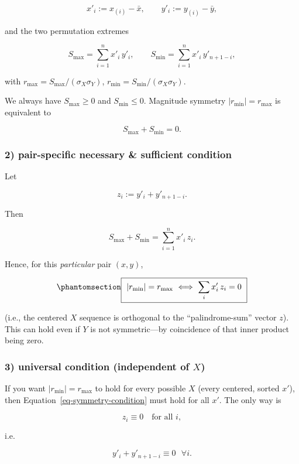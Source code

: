 \documentclass[
  12pt,
]{article}
\theoremstyle{plain}
\theoremstyle{definition}
\theoremstyle{remark}
\begin{document}
\[x'_i:=x_{(i)}-\bar x,\qquad y'_i:=y_{(i)}-\bar y,\]

and the two permutation extremes

\[S_{\max}=\sum_{i=1}^n x'_i\,y'_i,\qquad  
S_{\min}=\sum_{i=1}^n x'_i\,y'_{n+1-i},\]

with \(r_{\max}=S_{\max}/(\sigma_X\sigma_Y)\),
\(r_{\min}=S_{\min}/(\sigma_X\sigma_Y)\).

We always have \(S_{\max}\ge 0\) and \(S_{\min}\le 0\). Magnitude
symmetry \(|r_{\min}|=r_{\max}\) is equivalent to

\[S_{\max}+S_{\min}=0.\]

\subsubsection{2) pair-specific necessary \& sufficient
condition}\label{pair-specific-necessary-sufficient-condition}

Let

\[z_i := y'_i + y'_{n+1-i}.\]

Then

\[S_{\max}+S_{\min}=\sum_{i=1}^n x'_i\,z_i.\]

Hence, for this \emph{particular} pair \((x,y)\),

\begin{equation}\phantomsection\label{eq-symmetry-condition}{\boxed{\ |r_{\min}|=r_{\max}\ \Longleftrightarrow\ \sum_i x'_i\,z_i=0\ }}\end{equation}

(i.e., the centered \(X\) sequence is orthogonal to the
``palindrome-sum'' vector \(z\)).\\
This can hold even if \(Y\) is not symmetric---by coincidence of that
inner product being zero.

\subsubsection{\texorpdfstring{3) universal condition (independent of
\(X\))}{3) universal condition (independent of X)}}\label{universal-condition-independent-of-x}

If you want \(|r_{\min}|=r_{\max}\) to hold for every possible \(X\)
(every centered, sorted \(x'\)), then
Equation~\ref{eq-symmetry-condition} must hold for all \(x'\). The only
way is

\[z_i \equiv 0\quad\text{for all }i,\]

i.e.

\[y'_i + y'_{n+1-i}\equiv 0\ \ \ \forall i.\]
\end{document}

